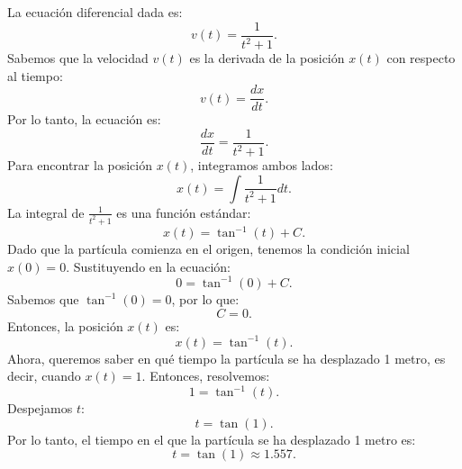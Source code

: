\documentclass[12pt]{exam}
\begin{document}
\begin{questions}
La ecuación diferencial dada es:
\[
v(t) = \frac{1}{t^2 + 1}.
\]
Sabemos que la velocidad \(v(t)\) es la derivada de la posición \(x(t)\) con respecto al tiempo:
\[
v(t) = \frac{dx}{dt}.
\]
Por lo tanto, la ecuación es:
\[
\frac{dx}{dt} = \frac{1}{t^2 + 1}.
\]
Para encontrar la posición \(x(t)\), integramos ambos lados:
\[
x(t) = \int \frac{1}{t^2 + 1} dt.
\]
La integral de \(\frac{1}{t^2 + 1}\) es una función estándar:
\[
x(t) = \tan^{-1}(t) + C.
\]
Dado que la partícula comienza en el origen, tenemos la condición inicial \(x(0) = 0\). Sustituyendo en la ecuación:
\[
0 = \tan^{-1}(0) + C.
\]
Sabemos que \(\tan^{-1}(0) = 0\), por lo que:
\[
C = 0.
\]
Entonces, la posición \(x(t)\) es:
\[
x(t) = \tan^{-1}(t).
\]
Ahora, queremos saber en qué tiempo la partícula se ha desplazado 1 metro, es decir, cuando \(x(t) = 1\). Entonces, resolvemos:
\[
1 = \tan^{-1}(t).
\]
Despejamos \(t\):
\[
t = \tan(1).
\]
Por lo tanto, el tiempo en el que la partícula se ha desplazado 1 metro es:
\[
t = \tan(1) \approx 1.557.
\]


\end{questions}
\end{document}
